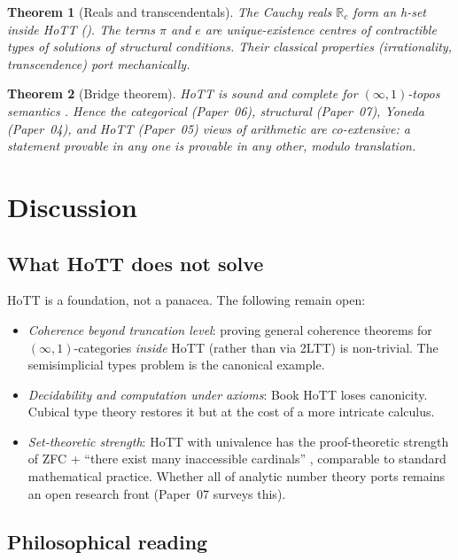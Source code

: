\documentclass[12pt]{article}
\newtheorem{theorem}{Theorem}[section]
\theoremstyle{definition}
\theoremstyle{remark}
\newcommand{\R}{\mathbb{R}}
\begin{document}
\begin{theorem}[Reals and transcendentals]
\label{thm:reals-result}
The Cauchy reals $\R_c$ form an h-set inside HoTT
(). The terms $\pi$ and $e$ are unique-existence centres of
contractible types of solutions of structural conditions. Their classical
properties (irrationality, transcendence) port mechanically.
\end{theorem}

\begin{theorem}[Bridge theorem]
\label{thm:bridge-result}
HoTT is sound and complete for $(\infty, 1)$-topos semantics
\cite{ShulmanInftyTopos}. Hence the categorical (Paper~06), structural
(Paper~07), Yoneda (Paper~04), and HoTT (Paper~05) views of arithmetic are
co-extensive: a statement provable in any one is provable in any other,
modulo translation.
\end{theorem}

\section{Discussion}
\label{sec:discussion}

\subsection{What HoTT does not solve}

HoTT is a foundation, not a panacea. The following remain open:

\begin{itemize}
\item \emph{Coherence beyond truncation level}: proving general coherence
theorems for $(\infty, 1)$-categories \emph{inside} HoTT (rather than via
2LTT) is non-trivial. The semisimplicial types problem
\cite{SemisimplicialProblem} is the canonical example.
\item \emph{Decidability and computation under axioms}: Book HoTT loses
canonicity. Cubical type theory restores it but at the cost of a more
intricate calculus.
\item \emph{Set-theoretic strength}: HoTT with univalence has the
proof-theoretic strength of ZFC + ``there exist many inaccessible
cardinals'' \cite{ShulmanStrength}, comparable to standard mathematical
practice. Whether all of analytic number theory ports remains an open
research front (Paper~07 surveys this).
\end{itemize}

\subsection{Philosophical reading}
\end{document}
